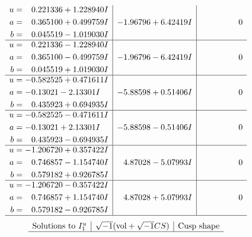 \documentclass[1p]{elsarticle_modified}
\theoremstyle{definition}
\newcommand{\I}{\sqrt{-1}}
\begin{document}
$$\begin{array}{c|c|c}
\begin{aligned}
u &= \phantom{-}0.221336 + 1.228940 I \\
a &= \phantom{-}0.365100 + 0.499759 I \\
b &= \phantom{-}0.045519 - 1.019030 I\end{aligned}
 & -1.96796 + 6.42419 I & \phantom{-0.000000 } 0 \\ \hline\begin{aligned}
u &= \phantom{-}0.221336 - 1.228940 I \\
a &= \phantom{-}0.365100 - 0.499759 I \\
b &= \phantom{-}0.045519 + 1.019030 I\end{aligned}
 & -1.96796 - 6.42419 I & \phantom{-0.000000 } 0 \\ \hline\begin{aligned}
u &= -0.582525 + 0.471611 I \\
a &= -0.13021 - 2.13301 I \\
b &= \phantom{-}0.435923 + 0.694935 I\end{aligned}
 & -5.88598 + 0.51406 I & \phantom{-0.000000 } 0 \\ \hline\begin{aligned}
u &= -0.582525 - 0.471611 I \\
a &= -0.13021 + 2.13301 I \\
b &= \phantom{-}0.435923 - 0.694935 I\end{aligned}
 & -5.88598 - 0.51406 I & \phantom{-0.000000 } 0 \\ \hline\begin{aligned}
u &= -1.206720 + 0.357422 I \\
a &= \phantom{-}0.746857 - 1.154740 I \\
b &= \phantom{-}0.579182 + 0.926785 I\end{aligned}
 & \phantom{-}4.87028 - 5.07993 I & \phantom{-0.000000 } 0 \\ \hline\begin{aligned}
u &= -1.206720 - 0.357422 I \\
a &= \phantom{-}0.746857 + 1.154740 I \\
b &= \phantom{-}0.579182 - 0.926785 I\end{aligned}
 & \phantom{-}4.87028 + 5.07993 I & \phantom{-0.000000 } 0\\
 \hline 
 \end{array}$$\newpage$$\begin{array}{c|c|c}  
\text{Solutions to }I^u_{1}& \I (\text{vol} + \sqrt{-1}CS) & \text{Cusp shape}\\
 \hline 

\end{array}$$
\end{document}
